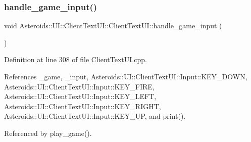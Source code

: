 \subsubsection{\texorpdfstring{handle\+\_\+game\+\_\+input()}{handle\_game\_input()}}
{\footnotesize\ttfamily void Asteroids\+::\+U\+I\+::\+Client\+Text\+U\+I\+::\+Client\+Text\+U\+I\+::handle\+\_\+game\+\_\+input (\begin{DoxyParamCaption}{ }\end{DoxyParamCaption})\hspace{0.3cm}{\ttfamily [private]}}



Definition at line 308 of file Client\+Text\+U\+I.\+cpp.



References \+\_\+game, \+\_\+input, Asteroids\+::\+U\+I\+::\+Client\+Text\+U\+I\+::\+Input\+::\+K\+E\+Y\+\_\+\+D\+O\+WN, Asteroids\+::\+U\+I\+::\+Client\+Text\+U\+I\+::\+Input\+::\+K\+E\+Y\+\_\+\+F\+I\+RE, Asteroids\+::\+U\+I\+::\+Client\+Text\+U\+I\+::\+Input\+::\+K\+E\+Y\+\_\+\+L\+E\+FT, Asteroids\+::\+U\+I\+::\+Client\+Text\+U\+I\+::\+Input\+::\+K\+E\+Y\+\_\+\+R\+I\+G\+HT, Asteroids\+::\+U\+I\+::\+Client\+Text\+U\+I\+::\+Input\+::\+K\+E\+Y\+\_\+\+UP, and print().



Referenced by play\+\_\+game().

